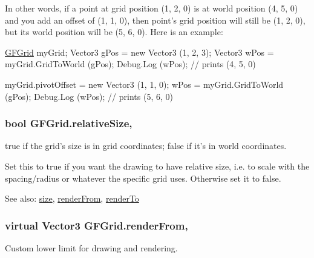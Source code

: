 In other words, if a point at grid position (1, 2, 0) is at world position (4, 5, 0) and you add an offset of (1, 1, 0), then point's grid position will still be (1, 2, 0), but its world position will be (5, 6, 0). Here is an example\+: 
\begin{DoxyCode}
\hyperlink{class_g_f_grid}{GFGrid} myGrid;
Vector3 gPos = \textcolor{keyword}{new} Vector3 (1, 2, 3);
Vector3 wPos = myGrid.GridToWorld (gPos); 
Debug.Log (wPos); \textcolor{comment}{// prints (4, 5, 0)}

myGrid.pivotOffset = \textcolor{keyword}{new} Vector3 (1, 1, 0);
wPos = myGrid.GridToWorld (gPos); 
Debug.Log (wPos); \textcolor{comment}{// prints (5, 6, 0)}
\end{DoxyCode}
 \hypertarget{class_g_f_grid_a65d207e3957240c935645db01a199419_a65d207e3957240c935645db01a199419}{
\subsubsection[{relative\+Size}]{\setlength{\rightskip}{0pt plus 5cm}bool G\+F\+Grid.\+relative\+Size\hspace{0.3cm}{\ttfamily [get]}, {\ttfamily [set]}}}\label{class_g_f_grid_a65d207e3957240c935645db01a199419_a65d207e3957240c935645db01a199419}
{\ttfamily true} if the grid's size is in grid coordinates; {\ttfamily false} if it's in world coordinates.

Set this to {\ttfamily true} if you want the drawing to have relative size, i.\+e. to scale with the spacing/radius or whatever the specific grid uses. Otherwise set it to {\ttfamily false}.

See also\+: \hyperlink{class_g_f_grid_a336f54e5b5f677871876dc3d90cc611d_a336f54e5b5f677871876dc3d90cc611d}{size}, \hyperlink{class_g_f_grid_a4556eac3905975b9024addb169c629d8_a4556eac3905975b9024addb169c629d8}{render\+From}, \hyperlink{class_g_f_grid_af9ec4b040505718f58a7841087d9b72a_af9ec4b040505718f58a7841087d9b72a}{render\+To} \hypertarget{class_g_f_grid_a4556eac3905975b9024addb169c629d8_a4556eac3905975b9024addb169c629d8}{
\subsubsection[{render\+From}]{\setlength{\rightskip}{0pt plus 5cm}virtual Vector3 G\+F\+Grid.\+render\+From\hspace{0.3cm}{\ttfamily [get]}, {\ttfamily [set]}}}\label{class_g_f_grid_a4556eac3905975b9024addb169c629d8_a4556eac3905975b9024addb169c629d8}
Custom lower limit for drawing and rendering.

